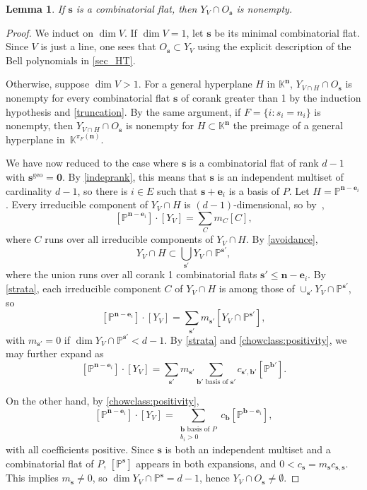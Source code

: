 \documentclass[11pt]{article}
\newtheorem{lemm}[theo]{Lemma}
\theoremstyle{definition}
\numberwithin{equation}{section}
\renewcommand{\P}{\mathbb{P}}
\newcommand{\geo}{\mathrm{geo}}
\newcommand{\K}{\mathbb{K}}
\begin{document}
\begin{lemm}\label{inclusion}
If $\mathbf s$ is a combinatorial flat, then $Y_V \cap O_{\mathbf s}$ is nonempty.  
\end{lemm}
\begin{proof}
  We induct on $\dim V$.
  If $\dim V = 1$, let $\mathbf s$ be its minimal combinatorial flat.
  Since $V$ is just a line, one sees that $O_{\mathbf s} \subset Y_V$ using the explicit description of the Bell polynomials in \cref{sec_HT}.

  Otherwise, suppose $\dim V > 1$.
  For a general hyperplane $H$ in $\K^{\mathbf n}$, $Y_{V \cap H} \cap O_{\mathbf s}$ is nonempty for every combinatorial flat $\mathbf s$ of corank greater than 1 by the induction hypothesis and \cref{truncation}.
  By the same argument, if $F = \{i : s_i = n_i\}$ is nonempty, then  $Y_{V \cap H} \cap O_{\mathbf s}$ is nonempty for $H \subset \K^{\mathbf n}$ the preimage of a general hyperplane in~$\K^{\pi_F(\mathbf n)}$.

  We have now reduced to the case where $\mathbf s$ is a combinatorial flat of rank $d-1$ with $\mathbf s^\geo = \mathbf 0$.
  By \cref{indeprank}, this means that $\mathbf s$ is an independent multiset of cardinality $d-1$, so there is $i \in E$ such that $\mathbf s + \mathbf e_i$ is a basis of $P$.
  Let $H = \P^{\mathbf n - \mathbf e_i}$.
  Every irreducible component of $Y_V \cap H$ is $(d-1)$-dimensional, so by~\cite[Theorem 1.26]{EH16},
  \[
    [\P^{\mathbf n - \mathbf e_i}] \cdot [Y_V] = \sum_C m_C [C],
  \]
  where $C$ runs over all irreducible components of $Y_V \cap H$.
  By \cref{avoidance}, 
  \[
  Y_V \cap H \subset \bigcup_{\mathbf s'} Y_V \cap \P^{\mathbf s'},
  \]
  where the union runs over all corank 1 combinatorial flats $\mathbf s' \leq \mathbf n - \mathbf e_i$.
  By \cref{strata}, each irreducible component $C$ of $Y_V \cap H$ is among those of $\cup_{\mathbf s'} Y_V \cap \P^{\mathbf s'}$, so
  \[
        [\P^{\mathbf n - \mathbf e_i}] \cdot [Y_V] = \sum_{\mathbf s'} m_{\mathbf s'} [Y_V \cap \P^{\mathbf s'}],
  \]
  with $m_{\mathbf s'} = 0$ if $\dim Y_V \cap \P^{\mathbf s'} < d-1$.
  By \cref{strata} and \cref{chowclass:positivity}, we may further expand as
  \[
        [\P^{\mathbf n - \mathbf e_i}] \cdot [Y_V] = \sum_{\mathbf s'} m_{\mathbf s'} \sum_{\mathbf b' \text{ basis of $\mathbf s'$}} c_{\mathbf s', \mathbf b'} [\P^{\mathbf b'}].
  \]
  
   On the other hand, by \cref{chowclass:positivity},
   \[
      [\P^{\mathbf n - \mathbf e_i}] \cdot [Y_V] = \sum_{\substack{\mathbf b \text{ basis of $P$}\\b_i > 0}} c_{\mathbf b} [\P^{\mathbf b - \mathbf e_i}],
   \]
   with all coefficients positive.
   Since $\mathbf s$ is both an independent multiset and a combinatorial flat of $P$,  $[\P^{\mathbf s}]$ appears in both expansions, and $0 < c_{\mathbf s} = m_{\mathbf s} c_{\mathbf s, \mathbf s}$.
   This implies $m_{\mathbf s} \neq 0$, so $\dim Y_V \cap \P^{\mathbf s} = d-1$, hence $Y_V \cap O_{\mathbf s} \neq \emptyset$.
\end{proof}
\end{document}
